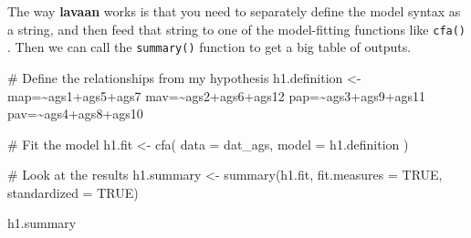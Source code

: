 \documentclass[
  letterpaper,
  DIV=11,
  numbers=noendperiod]{scrreprt}
\newenvironment{Shaded}{\begin{snugshade}}{\end{snugshade}}
\newcommand{\AttributeTok}[1]{\textcolor[rgb]{0.40,0.45,0.13}{#1}}
\newcommand{\CommentTok}[1]{\textcolor[rgb]{0.37,0.37,0.37}{#1}}
\newcommand{\ConstantTok}[1]{\textcolor[rgb]{0.56,0.35,0.01}{#1}}
\newcommand{\FunctionTok}[1]{\textcolor[rgb]{0.28,0.35,0.67}{#1}}
\newcommand{\NormalTok}[1]{\textcolor[rgb]{0.00,0.23,0.31}{#1}}
\newcommand{\OtherTok}[1]{\textcolor[rgb]{0.00,0.23,0.31}{#1}}
\newcommand{\StringTok}[1]{\textcolor[rgb]{0.13,0.47,0.30}{#1}}
\begin{document}
The way \textbf{lavaan} works is that you need to separately define the
model syntax as a string, and then feed that string to one of the
model-fitting functions like \texttt{cfa()} . Then we can call the
\texttt{summary()} function to get a big table of outputs.

\begin{Shaded}
\begin{Highlighting}[]
\CommentTok{\# Define the relationships from my hypothesis}
\NormalTok{h1.definition }\OtherTok{\textless{}{-}} 
\StringTok{\textquotesingle{}map=\textasciitilde{}ags1+ags5+ags7}
\StringTok{mav=\textasciitilde{}ags2+ags6+ags12}
\StringTok{pap=\textasciitilde{}ags3+ags9+ags11}
\StringTok{pav=\textasciitilde{}ags4+ags8+ags10\textquotesingle{}}

\CommentTok{\# Fit the model}
\NormalTok{h1.fit }\OtherTok{\textless{}{-}} \FunctionTok{cfa}\NormalTok{(}
  \AttributeTok{data  =}\NormalTok{ dat\_ags,}
  \AttributeTok{model =}\NormalTok{ h1.definition}
\NormalTok{)}

\CommentTok{\# Look at the results}
\NormalTok{h1.summary }\OtherTok{\textless{}{-}} \FunctionTok{summary}\NormalTok{(h1.fit, }\AttributeTok{fit.measures =} \ConstantTok{TRUE}\NormalTok{, }\AttributeTok{standardized =} \ConstantTok{TRUE}\NormalTok{)}

\NormalTok{h1.summary}
\end{Highlighting}
\end{Shaded}
\end{document}
